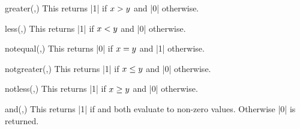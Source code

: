 \begin{math-function}{greater(,)}
\mathcommand
    This returns |1| if $x>y$ and |0| otherwise.
\begin{codeexample}[]
 \pgfmathresult
\end{codeexample}
\end{math-function}

\begin{math-function}{less(,)}
\mathcommand
    This returns |1| if $x<y$ and |0| otherwise.
\begin{codeexample}[]
 \pgfmathresult
\end{codeexample}
\end{math-function}

\begin{math-function}{notequal(,)}
\mathcommand
    This returns |0| if $x=y$ and |1| otherwise.
\begin{codeexample}[]
 \pgfmathresult
\end{codeexample}
\end{math-function}

\begin{math-function}{notgreater(,)}
\mathcommand
    This returns |1| if $x\leq y$ and |0| otherwise.
\begin{codeexample}[]
 \pgfmathresult
\end{codeexample}
\end{math-function}

\begin{math-function}{notless(,)}
\mathcommand
    This returns |1| if $x\geq y$ and |0| otherwise.
\begin{codeexample}[]
 \pgfmathresult
\end{codeexample}
\end{math-function}

\begin{math-function}{and(,)}
\mathcommand
    This returns |1| if  and  both evaluate to non-zero values.
    Otherwise |0| is returned.
\begin{codeexample}[]
 \pgfmathresult
\end{codeexample}
\end{math-function}

